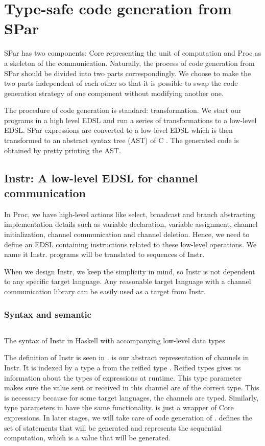 \chapter{Type-safe code generation from SPar} \label{chap:cg}
SPar has two components: Core representing the unit of computation and Proc as a skeleton of the communication. Naturally, the process of code generation from SPar should be divided into two parts correspondingly. We choose to make the two parts independent of each other so that it is possible to swap the code generation strategy of one component without modifying another one.

The procedure of code generation is standard: transformation. We start our programs in a high level EDSL and run a series of transformations to a low-level EDSL. SPar expressions are converted to a low-level EDSL which is then transformed to an abstract syntax tree (AST) of C \cite{LanguagecAnalysisGeneration}. The generated code is obtained by pretty printing the AST.
\section{Instr: A low-level EDSL for channel communication}
In Proc, we have high-level actions like select, broadcast and branch abstracting implementation details such as variable declaration, variable assignment, channel initialization, channel communication and channel deletion. Hence, we need to define an EDSL containing instructions related to these low-level operations. We name it Instr. programs will be translated to sequences of Instr. 

When we design Instr, we keep the simplicity in mind, so Instr is not dependent to any specific target language. Any reasonable target language with a channel communication library can be easily used as a target from Instr.

\subsection{Syntax and semantic}
\begin{listing}
    \inputminted{Haskell}{codegen/instr.hs} 
    \caption{The syntax of Instr in Haskell with accompanying low-level data types}
    \label{codegen:code:instr}
\end{listing}
The definition of Instr is seen in .  is our abstract representation of channels in Instr. It is indexed by a type a from the reified type . Reified types gives us information about the types of expressions at runtime. This type parameter makes sure the value sent or received in this channel are of the correct type. This is necessary because for some target languages, the channels are typed. Similarly, type parameters in  have the same functionality.  is just a wrapper of Core expressions. In later stages, we will take care of code generation of .  defines the set of statements that will be generated and  represents the sequential computation, which is a value that will be generated.

